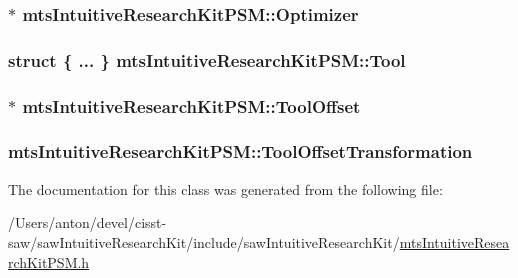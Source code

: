 \subsubsection[{Optimizer}]{$\ast$ mts\+Intuitive\+Research\+Kit\+P\+S\+M\+::\+Optimizer\hspace{0.3cm}{\ttfamily [protected]}}\label{classmts_intuitive_research_kit_p_s_m_a3ca72df1e884e0d754b6ac688f0715f0}
\hypertarget{classmts_intuitive_research_kit_p_s_m_ae73205ef14fdb6f97874a85fe1552ff2}{}
\subsubsection[{Tool}]{\setlength{\rightskip}{0pt plus 5cm}struct \{ ... \}   mts\+Intuitive\+Research\+Kit\+P\+S\+M\+::\+Tool\hspace{0.3cm}{\ttfamily [protected]}}\label{classmts_intuitive_research_kit_p_s_m_ae73205ef14fdb6f97874a85fe1552ff2}
\hypertarget{classmts_intuitive_research_kit_p_s_m_ab07541283bf0eee9126789cc3391f46b}{}
\subsubsection[{Tool\+Offset}]{$\ast$ mts\+Intuitive\+Research\+Kit\+P\+S\+M\+::\+Tool\+Offset\hspace{0.3cm}{\ttfamily [protected]}}\label{classmts_intuitive_research_kit_p_s_m_ab07541283bf0eee9126789cc3391f46b}
\hypertarget{classmts_intuitive_research_kit_p_s_m_ac57150a5c372984cffcc8e4f4c8c1203}{}
\subsubsection[{Tool\+Offset\+Transformation}]{ mts\+Intuitive\+Research\+Kit\+P\+S\+M\+::\+Tool\+Offset\+Transformation\hspace{0.3cm}{\ttfamily [protected]}}\label{classmts_intuitive_research_kit_p_s_m_ac57150a5c372984cffcc8e4f4c8c1203}


The documentation for this class was generated from the following file\+:\begin{DoxyCompactItemize}
\item 
/\+Users/anton/devel/cisst-\/saw/saw\+Intuitive\+Research\+Kit/include/saw\+Intuitive\+Research\+Kit/\hyperlink{mts_intuitive_research_kit_p_s_m_8h}{mts\+Intuitive\+Research\+Kit\+P\+S\+M.\+h}\end{DoxyCompactItemize}
